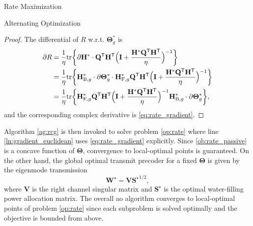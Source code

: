 \documentclass[journal]{IEEEtran}
\begin{document}
\begin{section}{Rate Maximization}
\begin{subsection}{Alternating Optimization}
		\begin{proof}
			The differential of $R$ w.r.t. $\mathbf{\Theta}_g^*$ is \cite{Hjorungnes2007}
			\begin{align*}
				\partial R
				& = \frac{1}{\eta} \mathrm{tr} \biggl\{ \partial \mathbf{H}^* \cdot \mathbf{Q}^\mathsf{T} \mathbf{H}^\mathsf{T} \Bigl(\mathbf{I} + \frac{\mathbf{H}^* \mathbf{Q}^\mathsf{T} \mathbf{H}^\mathsf{T}}{\eta}\Bigr)^{-1} \biggr\}\\
				& = \frac{1}{\eta} \mathrm{tr} \biggl\{ \mathbf{H}_{\mathrm{B},g}^* \cdot \partial \mathbf{\Theta}_g^* \cdot \mathbf{H}_{\mathrm{F},g}^* \mathbf{Q}^\mathsf{T} \mathbf{H}^\mathsf{T} \Bigl(\mathbf{I} + \frac{\mathbf{H}^* \mathbf{Q}^\mathsf{T} \mathbf{H}^\mathsf{T}}{\eta}\Bigr)^{-1} \biggr\}\\
				& = \frac{1}{\eta} \mathrm{tr} \biggl\{ \mathbf{H}_{\mathrm{F},g}^* \mathbf{Q}^\mathsf{T} \mathbf{H}^\mathsf{T} \Bigl(\mathbf{I} + \frac{\mathbf{H}^* \mathbf{Q}^\mathsf{T} \mathbf{H}^\mathsf{T}}{\eta}\Bigr)^{-1} \mathbf{H}_{\mathrm{B},g}^* \cdot \partial \mathbf{\Theta}_g^* \biggr\},
			\end{align*}
			and the corresponding complex derivative is \eqref{eq:rate_gradient}.
		\end{proof}
		Algorithm \ref{ag:rcg} is then invoked to solve problem \eqref{op:rate} where line \ref{ln:gradient_euclidean} uses \eqref{eq:rate_gradient} explicitly.
		Since \eqref{ob:rate_passive} is a concave function of $\mathbf{\Theta}$, convergence to local-optimal points is guaranteed.
		On the other hand, the global optimal transmit precoder for a fixed $\mathbf{\Theta}$ is given by the eigenmode transmission \cite{Clerckx2013}
		\begin{equation}
			\mathbf{W}^\star = \mathbf{V} {\mathbf{S}^\star}^{1/2},
			\label{eq:precoder_eigenmode}
		\end{equation}
		where $\mathbf{V}$ is the right channel singular matrix and $\mathbf{S}^\star$ is the optimal water-filling power allocation matrix.
		The overall \gls{ao} algorithm converges to local-optimal points of problem \eqref{op:rate} since each subproblem is solved optimally and the objective is bounded from above.
	\end{subsection}


\end{section}
\end{document}
